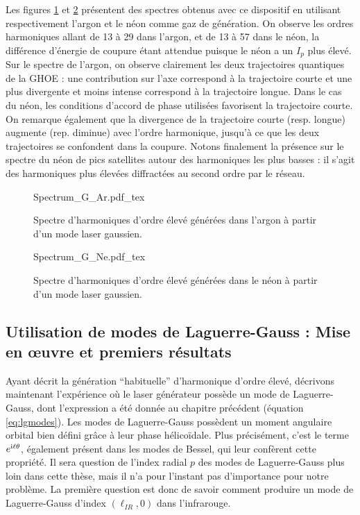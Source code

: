 Les figures \ref{Fig:SpectrumGAr} et \ref{Fig:SpectrumGNe} présentent des spectres obtenus avec ce dispositif en utilisant respectivement l'argon et le néon comme gaz de génération. On observe les ordres harmoniques allant de 13 à 29 dans l'argon, et de 13 à 57 dans le néon, la différence d'énergie de coupure étant attendue puisque le néon a un $I_p$ plus élevé. Sur le spectre de l'argon, on observe clairement les deux trajectoires quantiques de la GHOE : une contribution sur l'axe correspond à la trajectoire courte et une plus divergente et moins intense correspond à la trajectoire longue. Dans le cas du néon, les conditions d'accord de phase utilisées favorisent la trajectoire courte. On remarque également que la divergence de la trajectoire courte (resp. longue) augmente (rep. diminue) avec l'ordre harmonique, jusqu'à ce que les deux trajectoires se confondent dans la coupure. Notons finalement la présence sur le spectre du néon de pics satellites autour des harmoniques les plus basses : il s'agit des harmoniques plus élevées diffractées au second ordre par le réseau.
\begin{figure}[!ht]
\centering
\def\svgwidth{\columnwidth}
{Spectrum_G_Ar.pdf_tex}
\caption{Spectre d'harmoniques d'ordre élevé générées dans l'argon à partir d'un mode laser gaussien.}
\label{Fig:SpectrumGAr}
\end{figure}
\begin{figure}[!ht]
\centering
\def\svgwidth{\columnwidth}
{Spectrum_G_Ne.pdf_tex}
\caption{Spectre d'harmoniques d'ordre élevé générées dans le néon à partir d'un mode laser gaussien.}
\label{Fig:SpectrumGNe}
\end{figure}

\subsection{Utilisation de modes de Laguerre-Gauss : Mise en œuvre et premiers résultats}
Ayant décrit la génération ``habituelle'' d'harmonique d'ordre élevé, décrivons maintenant l'expérience où le laser générateur possède un mode de Laguerre-Gauss, dont l'expression a été donnée au chapitre précédent (équation \ref{eq:lgmodes}). Les modes de Laguerre-Gauss possèdent un moment angulaire orbital bien défini grâce à leur phase hélicoïdale. Plus précisément, c'est le terme $e^{\mathrm{i}\ell\theta}$, également présent dans les modes de Bessel, qui leur confèrent cette propriété. Il sera question de l'index radial $p$ des modes de Laguerre-Gauss plus loin dans cette thèse, mais il n'a pour l'instant pas d'importance pour notre problème. La première question est donc de savoir comment produire un mode de Laguerre-Gauss d'index $(\ell_{IR},0)$ dans l'infrarouge. 

